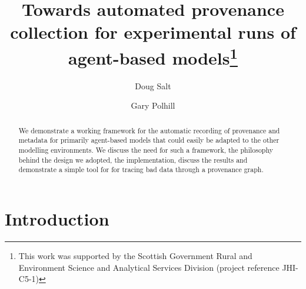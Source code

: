\documentclass[runningheads]{llncs}
\begin{document}
%
\title{Towards automated provenance collection for experimental runs of agent-based models\thanks{This work was supported by the Scottish Government Rural and Environment Science and Analytical Services Division (project reference JHI-C5-1)}}
%
%
\author{Doug Salt \and
Gary Polhill }

%
%
%
\maketitle              %
%
\begin{abstract}
    We demonstrate a working framework for the automatic recording of
    provenance and metadata for primarily agent-based models that could easily
    be adapted to the other modelling environments. We discuss the need for
    such a framework, the philosophy behind the design we adopted, the
    implementation, discuss the results and demonstrate a simple tool for for
    tracing bad data through a provenance graph.

\end{abstract}
%
%
%
\section{Introduction}
\end{document}

